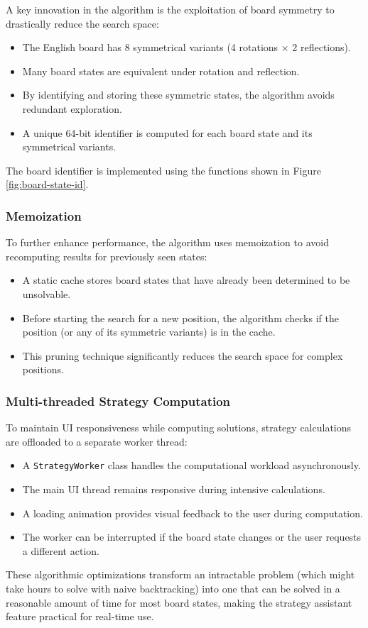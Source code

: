 A key innovation in the algorithm is the exploitation of board symmetry to drastically reduce the search space:
\begin{itemize}
    \item The English board has 8 symmetrical variants (4 rotations × 2 reflections).
    \item Many board states are equivalent under rotation and reflection.
    \item By identifying and storing these symmetric states, the algorithm avoids redundant exploration.
    \item A unique 64-bit identifier is computed for each board state and its symmetrical variants.
\end{itemize}

The board identifier is implemented using the functions shown in Figure \ref{fig:board-state-id}.

\subsubsection{Memoization}
To further enhance performance, the algorithm uses memoization to avoid recomputing results for previously seen states:
\begin{itemize}
    \item A static cache stores board states that have already been determined to be unsolvable.
    \item Before starting the search for a new position, the algorithm checks if the position (or any of its symmetric variants) is in the cache.
    \item This pruning technique significantly reduces the search space for complex positions.
\end{itemize}

\subsubsection{Multi-threaded Strategy Computation}
To maintain UI responsiveness while computing solutions, strategy calculations are offloaded to a separate worker thread:
\begin{itemize}
    \item A \texttt{StrategyWorker} class handles the computational workload asynchronously.
    \item The main UI thread remains responsive during intensive calculations.
    \item A loading animation provides visual feedback to the user during computation.
    \item The worker can be interrupted if the board state changes or the user requests a different action.
\end{itemize}

These algorithmic optimizations transform an intractable problem (which might take hours to solve with naive backtracking) into one that can be solved in a reasonable amount of time for most board states, making the strategy assistant feature practical for real-time use.